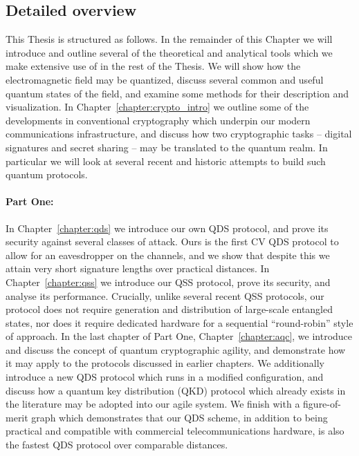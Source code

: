\subsection*{Detailed overview}

This Thesis is structured as follows. In the remainder of this Chapter we will introduce and outline several of the theoretical and analytical tools which we make extensive use of in the rest of the Thesis. We will show how the electromagnetic field may be quantized, discuss several common and useful quantum states of the field, and examine some methods for their description and visualization. In Chapter~\ref{chapter:crypto_intro} we outline some of the developments in conventional cryptography which underpin our modern communications infrastructure, and discuss how two cryptographic tasks -- digital signatures and secret sharing -- may be translated to the quantum realm. In particular we will look at several recent and historic attempts to build such quantum protocols.

\paragraph{Part One:} In Chapter~\ref{chapter:qds} we introduce our own QDS protocol, and prove its security against several classes of attack. Ours is the first CV QDS protocol to allow for an eavesdropper on the channels, and we show that despite this we attain very short signature lengths over practical distances. In Chapter~\ref{chapter:qss} we introduce our QSS protocol, prove its security, and analyse its performance. Crucially, unlike several recent QSS protocols, our protocol does not require generation and distribution of large-scale entangled states, nor does it require dedicated hardware for a sequential ``round-robin'' style of approach. In the last chapter of Part One, Chapter~\ref{chapter:aqc}, we introduce and discuss the concept of quantum cryptographic agility, and demonstrate how it may apply to the protocols discussed in earlier chapters. We additionally introduce a new QDS protocol which runs in a modified configuration, and discuss how a quantum key distribution (QKD) protocol which already exists in the literature may be adopted into our agile system. We finish with a figure-of-merit graph which demonstrates that our QDS scheme, in addition to being practical and compatible with commercial telecommunications hardware, is also the fastest QDS protocol over comparable distances. 

